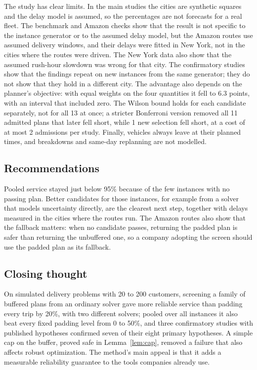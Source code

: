 \documentclass[12pt,letterpaper]{article}
\newcommand{\WtEqualPCMean}{6.3}
\newcommand{\FwMissOrig}{11}
\newcommand{\FwMissFw}{1}
\newcommand{\FwLostMax}{2}
\begin{document}
The study has clear limits. In the main studies the cities are synthetic squares and the
delay model is assumed, so the percentages are not forecasts for a real fleet. The benchmark and Amazon checks show that the result is not specific to the
instance generator or to the assumed delay model, but the Amazon routes use
assumed delivery windows, and their delays were fitted in New York, not in the
cities where the routes were driven. The New York data also show that the assumed
rush-hour slowdown was wrong for that city. The confirmatory studies show that the findings repeat on new
instances from the same generator; they do not show that they hold in a different
city. The advantage also depends on the planner's objective: with equal weights on
the four quantities it fell to \WtEqualPCMean{} points, with an interval that
included zero. The Wilson bound holds for each candidate separately, not for all 13
at once; a stricter Bonferroni version removed all \FwMissOrig{} admitted plans that
later fell short, while \FwMissFw{} new selection fell short, at a cost of at most
\FwLostMax{} admissions per study. Finally, vehicles always leave at their planned
times, and breakdowns and same-day replanning are not modelled.

\subsection{Recommendations}

Pooled service stayed just below 95\% because of the few instances with no passing
plan. Better candidates for those instances, for example from a solver that models
uncertainty directly, are the clearest next step, together with delays measured in the
cities where the routes run. The Amazon routes also show that the fallback matters: when no
candidate passes, returning the padded plan is safer than returning the
unbuffered one, so a company adopting the screen should use the padded plan as its
fallback.

\subsection{Closing thought}

On simulated delivery problems with 20 to 200 customers, screening a family of
buffered plans from an ordinary solver gave more reliable service than padding every
trip by 20\%, with two different solvers; pooled over all instances it also beat
every fixed padding level from 0 to 50\%, and three confirmatory studies with
published hypotheses confirmed seven of their eight primary hypotheses. A simple cap
on the buffer, proved safe in Lemma~\ref{lem:cap}, removed a failure that also
affects robust optimization. The method's main appeal is that it adds a measurable
reliability guarantee to the tools companies already use.
\end{document}
